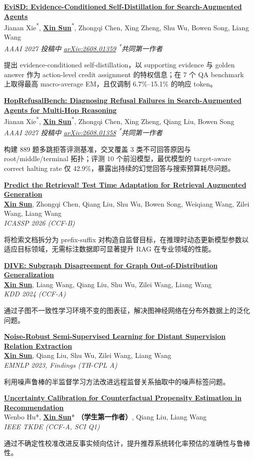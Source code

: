 \documentclass[letterpaper,11pt]{article}
\newcommand{\pubentry}[6]{
  \Needspace{6\baselineskip}
  \item \textbf{\href{#1}{#2}} \\
  {\small #3} \\
  {\small \textit{#4}\hfill #5}
  {#6\par}
  \vspace{0pt}
}
\begin{document}
\begin{enumerate}[leftmargin=0.3in, label={[\arabic*]}]
  \pubentry{https://arxiv.org/abs/2608.01359}{EviSD: Evidence-Conditioned Self-Distillation for Search-Augmented Agents}
  {Jianan Xie\textsuperscript{*}, \textbf{\underline{Xin Sun}}\textsuperscript{*}, Zhongqi Chen, Xing Zheng, Shu Wu, Bowen Song, Liang Wang}
  {AAAI 2027 投稿中 \quad \href{https://arxiv.org/abs/2608.01359}{arXiv:2608.01359} \quad \textsuperscript{*}共同第一作者}{}
  {\small\color{secondary} 提出 evidence-conditioned self-distillation，以 supporting evidence 与 golden answer 作为 action-level credit assignment 的特权信息；在 7 个 QA benchmark 上取得最高 macro-average EM，且仅调制 6.7\%--15.1\% 的响应 token。}

  \pubentry{https://arxiv.org/abs/2608.01358}{HopRefusalBench: Diagnosing Refusal Failures in Search-Augmented Agents for Multi-Hop Reasoning}
  {Jianan Xie\textsuperscript{*}, \textbf{\underline{Xin Sun}}\textsuperscript{*}, Zhongqi Chen, Xing Zheng, Qiang Liu, Bowen Song}
  {AAAI 2027 投稿中 \quad \href{https://arxiv.org/abs/2608.01358}{arXiv:2608.01358} \quad \textsuperscript{*}共同第一作者}{}
  {\small\color{secondary} 构建 889 题多跳拒答评测基准，交叉覆盖 3 类不可回答原因与 root/middle/terminal 拓扑；评测 10 个前沿模型，最优模型的 target-aware correct halting rate 仅 42.9\%，暴露出持续的幻觉回答与搜索预算耗尽问题。}

  \pubentry{https://arxiv.org/abs/2601.11443}{Predict the Retrieval! Test Time Adaptation for Retrieval Augmented Generation}
  {\textbf{\underline{Xin Sun}}, Zhongqi Chen, Qiang Liu, Shu Wu, Bowen Song, Weiqiang Wang, Zilei Wang, Liang Wang}
  {ICASSP 2026 (CCF-B)}{}
  {\small\color{secondary} 将检索文档拆分为 prefix-suffix 对构造自监督目标，在推理时动态更新模型参数以适应目标领域，无需标注数据即可显著提升 RAG 在专业领域的性能。}

  \pubentry{https://arxiv.org/abs/2408.04400}{DIVE: Subgraph Disagreement for Graph Out-of-Distribution Generalization}
  {\textbf{\underline{Xin Sun}}, Liang Wang, Qiang Liu, Shu Wu, Zilei Wang, Liang Wang}
  {KDD 2024 (CCF-A)}{}
  {\small\color{secondary} 通过子图不一致性学习环境不变的图表征，解决图神经网络在分布外数据上的泛化问题。}

  \pubentry{https://aclanthology.org/2023.findings-emnlp.876/}{Noise-Robust Semi-Supervised Learning for Distant Supervision Relation Extraction}
  {\textbf{\underline{Xin Sun}}, Qiang Liu, Shu Wu, Zilei Wang, Liang Wang}
  {EMNLP 2023, Findings (TH-CPL A)}{}
  {\small\color{secondary} 利用噪声鲁棒的半监督学习方法改进远程监督关系抽取中的噪声标签问题。}

  \pubentry{https://arxiv.org/abs/2303.12973}{Uncertainty Calibration for Counterfactual Propensity Estimation in Recommendation}
  {Wenbo Hu*, \textbf{\underline{Xin Sun}}* \textbf{（学生第一作者）}, Qiang Liu, Liang Wang}
  {IEEE TKDE (CCF-A, SCI Q1)}{}
  {\small\color{secondary} 通过不确定性校准改进反事实倾向估计，提升推荐系统转化率预估的准确性与鲁棒性。}

\end{enumerate}
\end{document}
